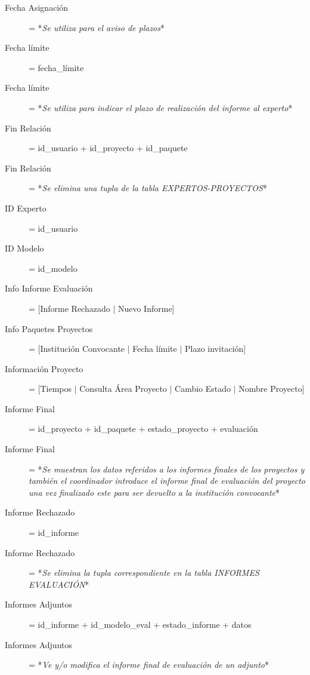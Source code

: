 \documentclass[12pt,a4paper,spanish,twoside]{book}
\begin{document}
\begin{description}
\item[Fecha Asignación] = *\emph{Se utiliza para el aviso de plazos}*

\item[Fecha límite] = fecha\_límite

\item[Fecha límite] = *\emph{Se utiliza para indicar el plazo de realización
    del informe al experto}* 

\item[Fin Relación] = id\_usuario + id\_proyecto + id\_paquete

\item[Fin Relación] = *\emph{Se elimina una tupla de la tabla
    EXPERTOS-PROYECTOS}* 

\item[ID Experto] = id\_usuario

\item[ID Modelo] = id\_modelo

\item[Info Informe Evaluación] = [Informe Rechazado $\mid$ Nuevo Informe]

\item[Info Paquetes Proyectos] = [Institución Convocante $\mid$ Fecha límite
  $\mid$ Plazo invitación] 

\item[Información Proyecto] = [Tiempos $\mid$ Consulta Área Proyecto $\mid$
  Cambio Estado $\mid$ Nombre Proyecto] 

\item[Informe Final] = id\_proyecto + id\_paquete + estado\_proyecto +
  evaluación 

\item[Informe Final] = *\emph{Se muestran los datos referidos a los informes
    finales de los proyectos y también el coordinador introduce el informe
    final de evaluación del proyecto una vez finalizado este para ser
    devuelto a la institución convocante}* 

\item[Informe Rechazado] = id\_informe

\item[Informe Rechazado] = *\emph{Se elimina la tupla correspondiente en la
    tabla INFORMES EVALUACIÓN}* 

\item[Informes Adjuntos] = id\_informe + id\_modelo\_eval + estado\_informe +
  datos 

\item[Informes Adjuntos] = *\emph{Ve y/o modifica el informe final de
    evaluación de un adjunto}* 


\end{description}
\end{document}
